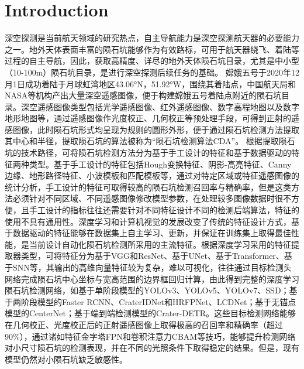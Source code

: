 \section{Introduction}
深空探测是当前航天领域的研究热点，自主导航能力是深空探测航天器的必要能力之一。地外天体表面丰富的陨石坑能够作为有效路标，可用于航天器绕飞、着陆等过程的自主导航，因此，获取高精度、详尽的地外天体陨石坑目录，尤其是中小型（10-100m）陨石坑目录，是进行深空探测后续任务的基础。
嫦娥五号于2020年12月1日成功着陆于月球虹湾地区43.06°N，51.92°W，围绕其着陆点，中国航天局和NASA等机构产出大量深空遥感图像，便于构建嫦娥五号着陆点附近的陨石坑目录。深空遥感图像类型包括光学遥感图像、红外遥感图像、数字高程地图以及数字地形地图等，通过遥感图像作光度校正、几何校正等预处理手段，可得到正射的遥感图像，此时陨石坑形式均呈现为规则的圆形外形，便于通过陨石坑检测方法提取其中心和半径，提取陨石坑的算法被称为“陨石坑检测算法CDA”。
根据提取陨石坑的技术路径，可将陨石坑检测方法分为基于手工设计的特征和基于数据驱动的特征两种类型。基于手工设计的特征包括Hough变换特征\cite{emamiCraterDetectionUsing2019}、阴影-高亮特征\cite{maassEdgefreeScalePose2011,maassRobustApproximationImage2016}、Canny边缘\cite{emamiCraterDetectionUsing2019}、地形路径特征\cite{wangNovelApproachMultiscale2022}、小波模板\cite{diMachineLearningApproach2014,wangActiveMachineLearning2019}和匹配模板\cite{bandeiraDetectionSubkilometerCraters2012}等，通过对特定区域或特征遥感图像的统计分析，手工设计的特征可取得较高的陨石坑检测召回率与精确率，但是这类方法必须针对不同区域、不同遥感图像修改模型参数，在处理较多图像数据时很不方便，且手工设计的指标往往还需要针对不同特征设计不同的检测后端算法，特征的使用不具有通用性。深度学习和计算机视觉的发展改变了传统的特征设计方式，基于数据驱动的特征能够在数据集上自主学习、更新，并保证在训练集上取得最佳性能，是当前设计自动化陨石坑检测所采用的主流特征。根据深度学习采用的特征提取器类型，可将特征分为基于VGG和ResNet\cite{wangCraterIDNetEndendFully2018,yangLunarImpactCrater2020,chenCraterDetectionRecognition2021}、基于UNet\cite{silburtLunarCraterIdentification2019,songEffectiveLunarCrater2020}、基于Transformer\cite{daiBoostingCraterDetection2023}、基于SNN\cite{zhaEnergyefficientCratersDetection2024}等，其输出的高维向量特征较为复杂，难以可视化，往往通过目标检测头网络完成陨石坑中心坐标与宽高范围的边界框回归计算，由此得到完整的深度学习陨石坑检测网络，如基于单阶段模型的YOLOv3\cite{fairweatherAutomaticMappingSmall2022}、YOLOv5\cite{liuTwostageAdaptiveNetwork2024}、YOLOv7\cite{daiBoostingCraterDetection2023}、SSD\cite{silvestriniOpticalNavigationLunar2022}；基于两阶段模型的Faster RCNN\cite{yangLunarImpactCrater2020,yangCraterDANetConvolutionalNeural2022,liuIdentificationLunarCraters2024}、CraterIDNet\cite{wangCraterIDNetEndendFully2018}和HRFPNet\cite{yangHighresolutionFeaturePyramid2022}、LCDNet\cite{miaoLCDNetInnovativeNeural2024}；基于无锚点模型的CenterNet\cite{zhangAutomaticDetectionSmallscale2024}；基于端到端检测模型的Crater-DETR\cite{guoCraterDETRNovelTransformer2024}。这些目标检测网络能够在几何校正、光度校正后的正射遥感图像上取得极高的召回率和精确率（超过90\%），通过诸如特征金字塔FPN\cite{linFeaturePyramidNetworks2017}和卷积注意力CBAM\cite{wooCBAMConvolutionalBlock2018}等技巧，能够提升检测网络对小尺寸陨石坑的检测表现，并在不同的光照条件下取得稳定的结果。但是，现有模型仍然对小陨石坑缺乏敏感性。

